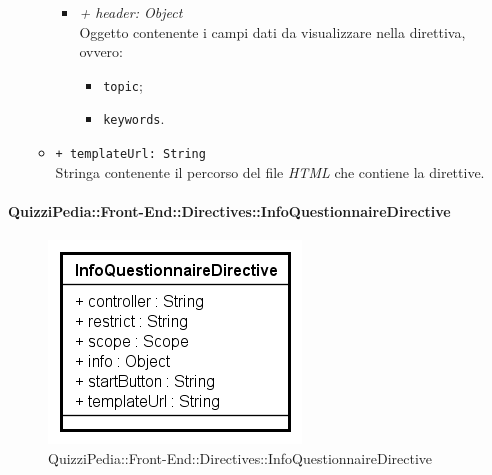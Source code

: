 \begin{itemize}
\begin{itemize}
				\begin{itemize}
					\item \textit{+ header: Object} \\ Oggetto contenente i campi dati da visualizzare nella direttiva, ovvero:
					\begin{itemize}
						\item \texttt{topic};
						\item \texttt{keywords}.
					\end{itemize}
				\end{itemize}
				\item \texttt{+ templateUrl: String} \\ Stringa contenente il percorso del file \textit{HTML} che contiene la direttive.
			\end{itemize}
		\end{itemize}
		
		\paragraph{QuizziPedia::Front-End::Directives::InfoQuestionnaireDirective}
		
		\label{QuizziPedia::Front-End::Directives::InfoQuestionnaireDirective}
		
		\begin{figure}[ht]
			\centering
			\includegraphics[scale=0.80,keepaspectratio]{UML/Classi/Front-End/QuizziPedia_Front-end_Templates_InfoQuestionnaireTemplate.png}
			\caption{QuizziPedia::Front-End::Directives::InfoQuestionnaireDirective}
		\end{figure} \FloatBarrier
		
